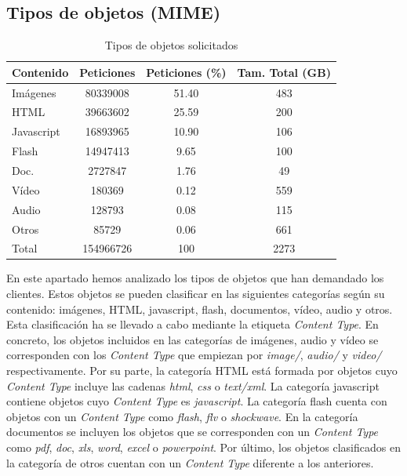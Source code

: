 \documentclass[twocolumn]{Jornadas}
\begin{document}
\subsection{Tipos de objetos (MIME)}
\label{mime}

\begin{table}
\centering
\renewcommand{\baselinestretch}{1.5}
\scriptsize
\begin{tabular}{|l||c|c|c|} \hline
Contenido   & Peticiones & Peticiones (\%) &Tam. Total (GB) \\\hline\hline
Imágenes    & 80339008   & 51.40 &483             \\\hline  
HTML        & 39663602   & 25.59 &200             \\\hline 
Javascript  & 16893965   & 10.90 &106             \\\hline 
Flash       & 14947413   & 9.65 & 100              \\\hline 
Doc.       & 2727847    & 1.76 &49              \\\hline
Vídeo       & 180369     & 0.12 & 559             \\\hline 
Audio       & 128793     & 0.08 & 115             \\\hline 
Otros       & 85729      & 0.06 & 661             \\\hline\hline
Total & 154966726 & 100 & 2273 \\\hline
\end{tabular}
\caption{Tipos de objetos solicitados}
\label{table:contenido}
\end{table}

En este apartado hemos analizado los tipos de objetos que han demandado los clientes.
Estos objetos se pueden clasificar en las siguientes categorías según su contenido: imágenes, HTML, javascript, flash, documentos, vídeo, audio y otros.
Esta clasificación ha se llevado a cabo mediante la etiqueta \emph{Content Type}. En concreto, los objetos incluidos en las categorías de imágenes, audio y vídeo se corresponden con los \emph{Content Type} que empiezan por \textit{image/}, \textit{audio/} y \textit{video/} respectivamente.
Por su parte, la categoría HTML está formada por objetos cuyo \emph{Content Type} incluye las cadenas \textit{html}, \textit{css} o \textit{text/xml}.
La categoría javascript contiene objetos cuyo \emph{Content Type} es \textit{javascript}. La categoría flash cuenta con objetos con un \emph{Content Type} como \textit{flash}, \textit{flv} o \textit{shockwave}. En la categoría documentos se incluyen los objetos que se corresponden con un \emph{Content Type} como \textit{pdf}, \textit{doc}, \textit{xls}, \textit{word}, \textit{excel} o \textit{powerpoint}. Por último, los objetos clasificados en la categoría de otros cuentan con un \emph{Content Type} diferente a los anteriores.
\end{document}
